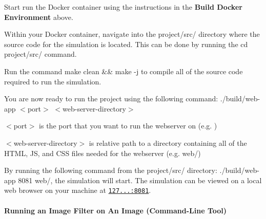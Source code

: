 \begin{DoxyEnumerate}
\item Start run the Docker container using the instructions in the {\bfseries Build Docker Environment} above.
\item Within your Docker container, navigate into the {\ttfamily project/src/} directory where the source code for the simulation is located. This can be done by running the {\ttfamily cd project/src/} command.
\item Run the command {\ttfamily make clean \&\& make -\/j} to compile all of the source code required to run the simulation.
\item You are now ready to run the project using the following command\+: {\ttfamily ./build/web-\/app $<$port$>$ $<$web-\/server-\/directory$>$}
\begin{DoxyEnumerate}
\item {\ttfamily $<$port$>$} is the port that you want to run the webserver on (e.\+g. {})
\item {\ttfamily $<$web-\/server-\/directory$>$} is relative path to a directory containing all of the H\+T\+ML, JS, and C\+SS files needed for the webserver (e.\+g. {\ttfamily web/})
\end{DoxyEnumerate}
\end{DoxyEnumerate}

By running the following command from the {\ttfamily project/src/} directory\+: {\ttfamily ./build/web-\/app 8081 web/}, the simulation will start. The simulation can be viewed on a local web browser on your machine at \href{http://127.0.0.1:8081/}{\tt 127...\+:8081}.

\paragraph*{Running an Image Filter on An Image (Command-\/\+Line Tool)}


